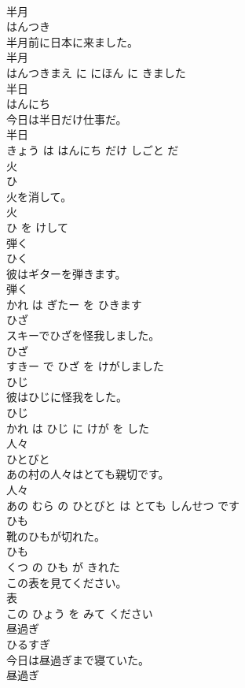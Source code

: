 \documentclass[8pt]{extreport}
\begin{document}
\begin{CJK}{UTF8}{min}
\\	半月	
\\	はんつき			
\\	半月前に日本に来ました。	
\\	半月 
\\	はんつきまえ に にほん に きました			
\\	半日	
\\	はんにち			
\\	今日は半日だけ仕事だ。	
\\	半日 
\\	きょう は はんにち だけ しごと だ			
\\	火	
\\	ひ			
\\	火を消して。	
\\	火 
\\	ひ を けして			
\\	弾く	
\\	ひく			
\\	彼はギターを弾きます。	
\\	弾く 
\\	かれ は ぎたー を ひきます			
\\	ひざ	
\\	スキーでひざを怪我しました。	
\\	ひざ 
\\	すきー で ひざ を けがしました			
\\	ひじ	
\\	彼はひじに怪我をした。	
\\	ひじ 
\\	かれ は ひじ に けが を した			
\\	人々	
\\	ひとびと			
\\	あの村の人々はとても親切です。	
\\	人々 
\\	あの むら の ひとびと は とても しんせつ です			
\\	ひも	
\\	靴のひもが切れた。	
\\	ひも 
\\	くつ の ひも が きれた			
\\	この表を見てください。	
\\	表 
\\	この ひょう を みて ください			
\\	昼過ぎ	
\\	ひるすぎ			
\\	今日は昼過ぎまで寝ていた。	
\\	昼過ぎ 

\end{CJK}
\end{document}
